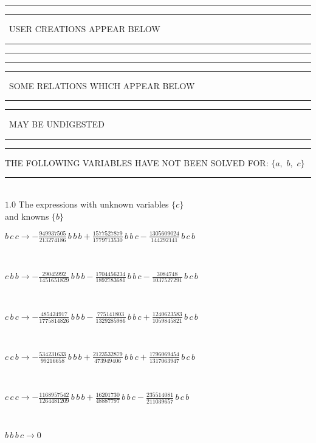 \documentclass[rep10,leqno]{report}
\begin{document}
\rule[2pt]{6in}{1pt}\hfil\break
\rule[2.5pt]{1.701in}{1pt}
\ USER CREATIONS APPEAR BELOW\ 
\rule[2.5pt]{1.701in}{1pt}\hfil\break
\rule[2pt]{6in}{1pt}\hfil\break
\rule[2pt]{6in}{4pt}\hfil\break
\rule[2pt]{1.45in}{4pt}
\ SOME RELATIONS WHICH APPEAR BELOW\ 
\rule[2pt]{1.45in}{4pt}\hfil\break
\rule[2pt]{2.18in}{4pt}
\ MAY BE UNDIGESTED\ 
\rule[2pt]{2.18in}{4pt}\hfil\break
\rule[2pt]{6in}{4pt}\hfil\break
THE FOLLOWING VARIABLES HAVE NOT BEEN SOLVED FOR:\hfil\break
$\{a,
$ $
b,
$ $
c\}$
\smallskip\\
\rule[3pt]{6in}{.7pt}\\
$1.0$  The expressions with unknown variables $\{c\}$\\
and knowns $\{b\}$\smallskip\\
\begin{minipage}{6in}
$
b\,
 c\,
 c\rightarrow -\frac{949937505}{213274186}\,
 b\,
 b\,
 b + \frac{1577527879}{1779713530}\,
 b\,
 b\,
 c - \frac{1305609024}{144292141}\,
 b\,
 c\,
 b
$
\end{minipage}\medskip \\
\begin{minipage}{6in}
$
c\,
 b\,
 b\rightarrow -\frac{29045992}{1451651829}\,
 b\,
 b\,
 b - \frac{1704456234}{1892783681}\,
 b\,
 b\,
 c - \frac{3084748}{1037527291}\,
 b\,
 c\,
 b
$
\end{minipage}\medskip \\
\begin{minipage}{6in}
$
c\,
 b\,
 c\rightarrow -\frac{485424917}{1775814826}\,
 b\,
 b\,
 b - \frac{775141803}{1329285986}\,
 b\,
 b\,
 c + \frac{1240623583}{1059845821}\,
 b\,
 c\,
 b
$
\end{minipage}\medskip \\
\begin{minipage}{6in}
$
c\,
 c\,
 b\rightarrow -\frac{534231633}{99216658}\,
 b\,
 b\,
 b + \frac{2123532879}{473949406}\,
 b\,
 b\,
 c + \frac{1796069454}{1317063947}\,
 b\,
 c\,
 b
$
\end{minipage}\medskip \\
\begin{minipage}{6in}
$
c\,
 c\,
 c\rightarrow -\frac{1168957542}{1264481209}\,
 b\,
 b\,
 b + \frac{16201730}{48887797}\,
 b\,
 b\,
 c - \frac{235514081}{211039657}\,
 b\,
 c\,
 b
$
\end{minipage}\medskip \\
\begin{minipage}{6in}
$
b\,
 b\,
 b\,
 c\rightarrow 0
$
\end{minipage}\medskip \\
\end{document}
